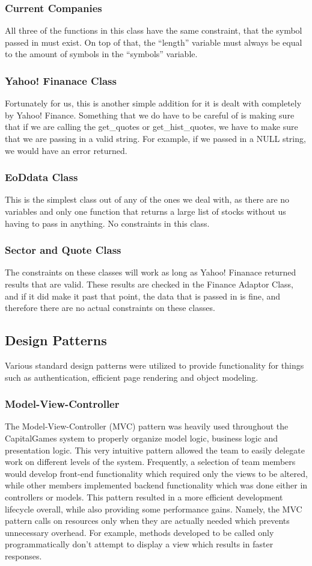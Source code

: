 \subsubsection{Current Companies}
All three of the functions in this class have the same constraint, that the symbol passed in must exist. On top of that, the ``length'' variable must always be equal to the amount of symbols in the ``symbols'' variable.
\subsubsection{Yahoo! Finanace Class}
Fortunately for us, this is another simple addition for it is dealt with completely by Yahoo! Finance. Something that we do have to be careful of is making sure that if we are calling the get\_quotes or get\_hist\_quotes, we have to make sure that we are passing in a valid string. For example, if we passed in a NULL string, we would have an error returned.
\subsubsection{EoDdata Class}
This is the simplest class out of any of the ones we deal with, as there are no variables and only one function that returns a large list of stocks without us having to pass in anything. No constraints in this class.
\subsubsection{Sector and Quote Class}
The constraints on these classes will work as long as Yahoo! Finanace returned results that are valid. These results are checked in the Finance Adaptor Class, and if it did make it past that point, the data that is passed in is fine, and therefore there are no actual constraints on these classes.


\subsection{Design Patterns}
Various standard design patterns were utilized to provide functionality for things such as authentication, efficient page rendering and object modeling.
\subsubsection{Model-View-Controller}
The Model-View-Controller (MVC) pattern was heavily used throughout the CapitalGames system to properly organize model logic, business logic and presentation logic. This very intuitive pattern allowed the team to easily delegate work on different levels of the system. Frequently, a selection of team members would develop front-end functionality which required only the views to be altered, while other members implemented backend functionality which was done either in controllers or models. This pattern resulted in a more efficient development lifecycle overall, while also providing some performance gains. Namely, the MVC pattern calls on resources only when they are actually needed which prevents unnecessary overhead. For example, methods developed to be called only programmatically don't attempt to display a view which results in faster responses.
